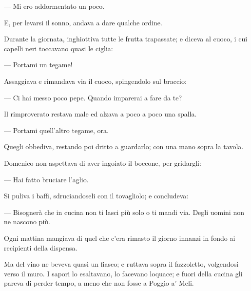 — Mi ero addormentato un poco.

E, per levarsi il sonno, andava a dare qualche ordine.

Durante la giornata, inghiottiva tutte le frutta trapassate; e diceva al cuoco, i cui capelli neri toccavano quasi le ciglia:

— Portami un tegame!

Assaggiava e rimandava via il cuoco, spingendolo sul braccio:

— Ci hai messo poco pepe. Quando imparerai a fare da te?

Il rimproverato restava male ed alzava a poco a poco una spalla.

— Portami quell’altro tegame, ora.

Quegli obbediva, restando poi dritto a guardarlo; con una mano sopra la tavola.

Domenico non aspettava di aver ingoiato il boccone, per gridargli:

— Hai fatto bruciare l’aglio.

Si puliva i baffi, sdruciandoseli con il tovagliolo; e concludeva:

— Bisognerà che in cucina non ti lasci più solo o ti mandi via. Degli uomini non ne nascono più.

Ogni mattina mangiava di quel che c’era rimasto il giorno innanzi in fondo ai recipienti della dispensa.

Ma del vino ne beveva quasi un fiasco; e ruttava sopra il fazzoletto, volgendosi verso il muro. I sapori lo esaltavano, lo facevano loquace; e fuori della cucina gli pareva di perder tempo, a meno che non fosse a Poggio a’ Meli.
